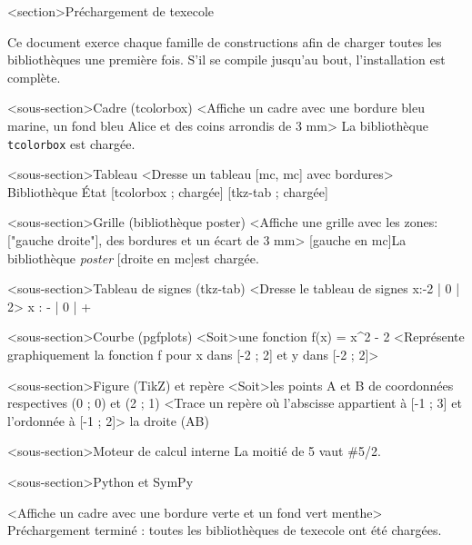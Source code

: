 \documentclass[marges=20, taille=11]{texecole}
\begin{document}
<section>{Préchargement de texecole}

Ce document exerce chaque famille de constructions afin de charger
toutes les bibliothèques une première fois. S'il se compile jusqu'au
bout, l'installation est complète.

<sous-section>{Cadre (tcolorbox)}
<Affiche un cadre avec une bordure bleu marine, un fond bleu Alice et des coins arrondis de 3 mm>{
La bibliothèque \texttt{tcolorbox} est chargée.
}

<sous-section>{Tableau}
<Dresse un tableau [mc, mc] avec bordures>{
	Bibliothèque	État
	[tcolorbox ; chargée]
	[tkz-tab ; chargée]
}

<sous-section>{Grille (bibliothèque poster)}
<Affiche une grille avec les zones:["gauche droite"], des bordures et un écart de 3 mm>{
  [gauche en mc]{La bibliothèque \emph{poster}}
  [droite en mc]{est chargée.}
}

<sous-section>{Tableau de signes (tkz-tab)}
<Dresse le tableau de signes x:{-2 | 0 | 2}>{
	x : - | 0 | +
}

<sous-section>{Courbe (pgfplots)}
<Soit>une fonction f(x) = x^2 - 2
<Représente graphiquement la fonction f pour x dans [-2 ; 2] et y dans [-2 ; 2]>

<sous-section>{Figure (TikZ) et repère}
<Soit>les points A et B de coordonnées respectives (0 ; 0) et (2 ; 1)
<Trace un repère où l'abscisse appartient à [-1 ; 3] et l'ordonnée à [-1 ; 2]>{
	la droite (AB)
}

<sous-section>{Moteur de calcul interne}
La moitié de 5 vaut #{5/2}.

<sous-section>{Python et SymPy}
\etatpython

<Affiche un cadre avec une bordure verte et un fond vert menthe>{
Préchargement terminé : toutes les bibliothèques de texecole ont été chargées.
}
\end{document}
